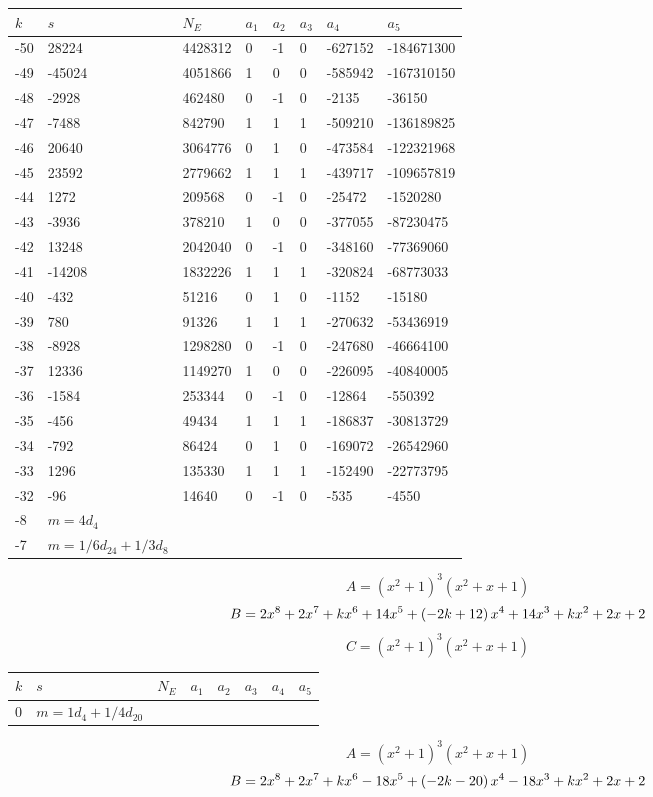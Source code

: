 \documentclass{amsart}
\begin{document}
\begin{longtable}{|l|l|l|lllll|}
\hline
$k$ & $s$ & $N_E$ & $a_1$ & $a_2$ & $a_3$ & $a_4$ & $a_5$\\
\hline
-50&28224&4428312&0&-1&0&-627152&-184671300\\
-49&-45024&4051866&1&0&0&-585942&-167310150\\
-48&-2928&462480&0&-1&0&-2135&-36150\\
-47&-7488&842790&1&1&1&-509210&-136189825\\
-46&20640&3064776&0&1&0&-473584&-122321968\\
-45&23592&2779662&1&1&1&-439717&-109657819\\
-44&1272&209568&0&-1&0&-25472&-1520280\\
-43&-3936&378210&1&0&0&-377055&-87230475\\
-42&13248&2042040&0&-1&0&-348160&-77369060\\
-41&-14208&1832226&1&1&1&-320824&-68773033\\
-40&-432&51216&0&1&0&-1152&-15180\\
-39&780&91326&1&1&1&-270632&-53436919\\
-38&-8928&1298280&0&-1&0&-247680&-46664100\\
-37&12336&1149270&1&0&0&-226095&-40840005\\
-36&-1584&253344&0&-1&0&-12864&-550392\\
-35&-456&49434&1&1&1&-186837&-30813729\\
-34&-792&86424&0&1&0&-169072&-26542960\\
-33&1296&135330&1&1&1&-152490&-22773795\\
-32&-96&14640&0&-1&0&-535&-4550\\
-8&$m=4d_{4}$&&\multicolumn{5}{c|}{}\\
-7&$m=1/6d_{24}+1/3d_{8}$&&\multicolumn{5}{c|}{}\\
\hline
\end{longtable}
$$A=(x^2
 + 1)^{3}(x^2
 + x
 + 1)$$
$$B=2\*x^8
 + 2\*x^7
 + k\*x^6
 + 14\*x^5
 + \left(-2\*k
 + 12\right) \*x^4
 + 14\*x^3
 + k\*x^2
 + 2\*x
 + 2$$
$$C=(x^2
 + 1)^{3}(x^2
 + x
 + 1)$$
\begin{longtable}{|l|l|l|lllll|}
\hline
$k$ & $s$ & $N_E$ & $a_1$ & $a_2$ & $a_3$ & $a_4$ & $a_5$\\
\hline
0&$m=1d_{4}+1/4d_{20}$&&\multicolumn{5}{c|}{}\\
\hline
\end{longtable}
$$A=(x^2
 + 1)^{3}(x^2
 + x
 + 1)$$
$$B=2\*x^8
 + 2\*x^7
 + k\*x^6
 - 18\*x^5
 + \left(-2\*k
 - 20\right) \*x^4
 - 18\*x^3
 + k\*x^2
 + 2\*x
 + 2$$
\end{document}
